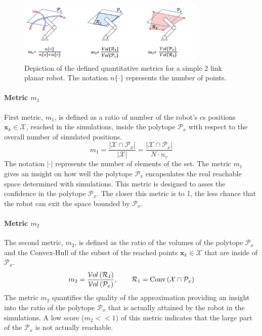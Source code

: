 \begin{figure}[!h]
    \centering
    \includegraphics[width=0.8\textwidth]{Papers/images/metrics.pdf}
    \caption{Depiction of the defined quantitative metrics for a simple 2 link planar robot. The notation $n\{\cdot\}$ represents the number of points.}
    \label{fig:metrics_defintition}
\end{figure}

\paragraph*{Metric $m_1$} First metric, $m_1$, is defined as a ratio of number of the robot's \gls{cs} positions $\bm{x}_k\in \mathcal{X}$, reached in the simulations, inside the polytope $\mathcal{P}_x$ with respect to the overall number of simulated positions. 
\begin{equation}
    m_1 = \frac{|\mathcal{X}\cap\mathcal{P}_x|}{|\mathcal{X}|} = \frac{|\mathcal{X}\cap\mathcal{P}_x|}{N\cdot n_v}
\end{equation}
The notation $|\cdot|$ represents the number of elements of the set. The metric $m_1$ gives an insight on how well the polytope $\mathcal{P}_x$ encapsulates the real reachable space determined with simulations. This metric is designed to asses the confidence in the polytope $\mathcal{P}_x$. The closer this metric is to 1, the less chance that the robot can exit the space bounded by $\mathcal{P}_x$.

\paragraph*{Metric $m_2$}  The second metric, $m_2$, is defined as the ratio of the volumes of the polytope $\mathcal{P}_x$ and the Convex-Hull of the subset of the reached points $\bm{x}_k\in\mathcal{X}$ that are inside of $\mathcal{P}_x$.
\begin{equation}
    m_2 = \frac{\mathcal{V}ol\left( \mathcal{R}_1\right)}{\mathcal{V}ol\left(\mathcal{P}_x\right)},\qquad  \mathcal{R}_1 = \text{Conv}\left(\mathcal{X}\cap\mathcal{P}_x\right)
\end{equation}
The metric $m_2$ quantifies the quality of the approximation providing an insight into the ratio of the polytope $\mathcal{P}_x$ that is actually attained by the robot in the simulations. A low score ($m_2 << 1$) of this metric indicates that the large part of the $\mathcal{P}_x$ is not actually reachable.

